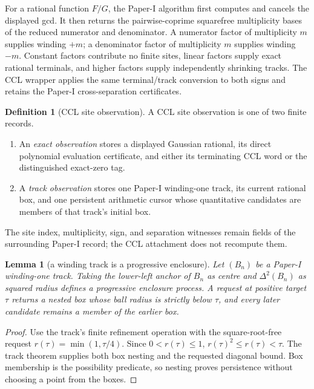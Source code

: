 \documentclass[10pt]{article}
\newtheorem{lemma}[theorem]{Lemma}
\theoremstyle{definition}
\newtheorem{definition}[theorem]{Definition}
\theoremstyle{remark}
\begin{document}
For a rational function $F/G$, the Paper-I algorithm first computes and cancels the displayed gcd.  It then returns the pairwise-coprime squarefree multiplicity bases of the reduced numerator and denominator.  A numerator factor of multiplicity $m$ supplies winding $+m$; a denominator factor of multiplicity $m$ supplies winding $-m$.  Constant factors contribute no finite sites, linear factors supply exact rational terminals, and higher factors supply independently shrinking tracks.  The CCL wrapper applies the same terminal/track conversion to both signs and retains the Paper-I cross-separation certificates.

\begin{definition}[CCL site observation]
A CCL site observation is one of two finite records.
\begin{enumerate}
\item An \emph{exact observation} stores a displayed Gaussian rational,
      its direct polynomial evaluation certificate, and either its terminating
      CCL word or the distinguished exact-zero tag.
\item A \emph{track observation} stores one Paper-I winding-one track, its
      current rational box, and one persistent arithmetic cursor whose
      quantitative candidates are members of that track's initial box.
\end{enumerate}
The site index, multiplicity, sign, and separation witnesses remain fields of
the surrounding Paper-I record; the CCL attachment does not recompute them.
\end{definition}

\begin{lemma}[a winding track is a progressive enclosure]
Let $(B_n)$ be a Paper-I winding-one track.  Taking the lower-left anchor of
$B_n$ as centre and $\Delta^2(B_n)$ as squared radius defines a progressive
enclosure process.  A request at positive target $\tau$ returns a nested box
whose ball radius is strictly below $\tau$, and every later candidate remains
a member of the earlier box.
\end{lemma}

\begin{proof}
Use the track's finite refinement operation with the square-root-free request
$r(\tau)=\min(1,\tau/4)$.  Since $0<r(\tau)\le1$,
$r(\tau)^2\le r(\tau)<\tau$.  The track theorem supplies both box nesting
and the requested diagonal bound.  Box membership is the possibility
predicate, so nesting proves persistence without choosing a point from the
boxes.
\end{proof}
\end{document}
